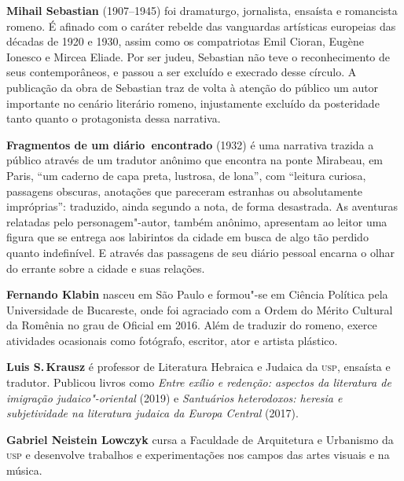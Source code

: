 
\textbf{Mihail Sebastian} (1907--1945) foi dramaturgo, jornalista, ensaísta e romancista romeno. É afinado com o caráter rebelde das vanguardas artísticas europeias das décadas de 1920 e 1930, assim como os compatriotas Emil Cioran, Eugène Ionesco e Mircea Eliade. Por ser judeu, Sebastian não teve o reconhecimento de seus contemporâneos, e passou a ser excluído e execrado desse círculo. A publicação da obra de Sebastian traz de volta à atenção do público um autor importante no cenário literário romeno, injustamente excluído da posteridade tanto quanto o protagonista dessa narrativa.

\textbf{Fragmentos de um diário~encontrado} (1932) é uma narrativa trazida a público através de um tradutor anônimo que encontra na ponte Mirabeau, em Paris, ``um caderno de capa preta, lustrosa, de lona'', com ``leitura curiosa, passagens obscuras, anotações que pareceram estranhas ou absolutamente impróprias'': traduzido, ainda segundo a nota, de forma desastrada. As aventuras relatadas pelo personagem"-autor, também anônimo, apresentam ao leitor uma figura que se entrega aos labirintos da cidade em busca de algo tão perdido quanto indefinível. E através das passagens de seu diário pessoal encarna o olhar do errante sobre a cidade e suas relações.


\textbf{Fernando Klabin} nasceu em São Paulo e formou"-se em Ciência Política pela Universidade de Bucareste, onde foi agraciado com a Ordem do Mérito Cultural da Romênia no grau de Oficial em 2016. Além de traduzir do romeno, exerce atividades ocasionais como fotógrafo, escritor, ator e artista plástico.

\textbf{Luis S.\,Krausz} é professor de Literatura Hebraica e Judaica da \textsc{usp}, ensaísta e tradutor. Publicou livros como \emph{Entre exílio e redenção: aspectos da literatura de imigração judaico"-oriental} (2019) e \emph{Santuários heterodoxos: heresia e subjetividade na literatura judaica da Europa Central} (2017).

\textbf{Gabriel Neistein Lowczyk} cursa a Faculdade de Arquitetura e Urbanismo da \textsc{usp} e desenvolve trabalhos e experimentações nos campos das artes visuais e na música.

